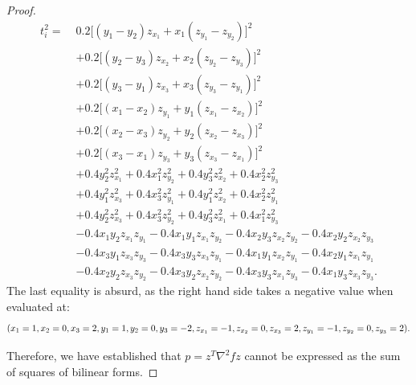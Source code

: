 \documentclass[10pt,a4paper]{amsart}
\begin{document}
\begin{proof}
\begin{align*}
     t_i^2 =\; & 0.2\Big[(y_1 - y_2)z_{x_1} + x_1(z_{y_1} - z_{y_2})\Big]^2 \\
&+ 0.2\Big[(y_2 - y_3)z_{x_2} + x_2(z_{y_2} - z_{y_3})\Big]^2 \\
&+ 0.2\Big[(y_3 - y_1)z_{x_3} + x_3(z_{y_3} - z_{y_1})\Big]^2 \\
&+ 0.2\Big[(x_1 - x_2)z_{y_1} + y_1(z_{x_1} - z_{x_2})\Big]^2 \\
&+ 0.2\Big[(x_2 - x_3)z_{y_2} + y_2(z_{x_2} - z_{x_3})\Big]^2 \\
&+ 0.2\Big[(x_3 - x_1)z_{y_3} + y_3(z_{x_3} - z_{x_1})\Big]^2 \\
&+ 0.4y_2^2z_{x_1}^2 + 0.4x_1^2z_{y_2}^2
+ 0.4y_3^2z_{x_2}^2 + 0.4x_2^2z_{y_3}^2 \\
&+ 0.4y_1^2z_{x_3}^2 + 0.4x_3^2z_{y_1}^2
+ 0.4y_1^2z_{x_2}^2 + 0.4x_2^2z_{y_1}^2 \\
&+ 0.4y_2^2z_{x_3}^2 + 0.4x_3^2z_{y_2}^2
+ 0.4y_3^2z_{x_1}^2 + 0.4x_1^2z_{y_3}^2 \\
&- 0.4x_1y_2z_{x_1}z_{y_1}
- 0.4x_1y_1z_{x_1}z_{y_2}
- 0.4x_2y_3z_{x_2}z_{y_2}
- 0.4x_2y_2z_{x_2}z_{y_3} \\
&- 0.4x_3y_1z_{x_3}z_{y_3}
- 0.4x_3y_3z_{x_3}z_{y_1}
- 0.4x_1y_1z_{x_2}z_{y_1}
- 0.4x_2y_1z_{x_1}z_{y_1} \\
&- 0.4x_2y_2z_{x_3}z_{y_2}
- 0.4x_3y_2z_{x_2}z_{y_2}
- 0.4x_3y_3z_{x_1}z_{y_3}
- 0.4x_1y_3z_{x_3}z_{y_3}.
\end{align*}
The last equality is absurd, as the right hand side takes a negative value when evaluated at:
\[
(x_1 =1, x_2=0, x_3=2, y_1=1, y_2=0, y_3=-2, z_{x_1}=-1, z_{x_2}=0, z_{x_3}=2, z_{y_1}=-1, z_{y_2}=0, \\z_{y_3}=2).
\]

Therefore, we have established that $p=z^T \nabla^2 f z$ cannot be expressed as the sum of squares of bilinear forms.

\end{proof}
\end{document}
